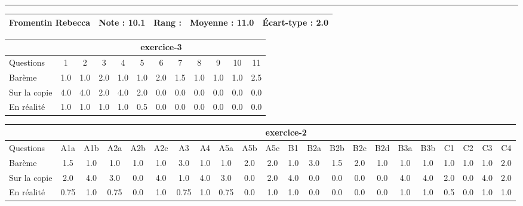 \documentclass[a4paper, landscape, 10pt]{article}
\begin{document}
  \vspace{0.3cm}
  \hrule
  \vspace{0.3cm}

  \begin{minipage}{\textwidth}
    { \bf
    \begin{tabular}{|c|*{4}{c|}}
    \hline
      Fromentin Rebecca & Note : 10.1 & Rang :  & Moyenne : 11.0 & \'Ecart-type : 2.0 \\
    \hline
    \end{tabular}
    }
    
      \begin{tabular}{|l|*{ 11 }{c|}}
        \hline
        & \multicolumn{ 11 }{c|}{ exercice-3 } \\
        \hline
        Questions & 1&2&3&4&5&6&7&8&9&10&11 \\
        \hline
        Barème & 1.0&1.0&2.0&1.0&1.0&2.0&1.5&1.0&1.0&1.0&2.5 \\
        \hline
        Sur la copie & 4.0&4.0&2.0&4.0&2.0&0.0&0.0&0.0&0.0&0.0&0.0 \\
        \hline
        En réalité & 1.0&1.0&1.0&1.0&0.5&0.0&0.0&0.0&0.0&0.0&0.0 \\
        \hline
      \end{tabular}
    
      \begin{tabular}{|l|*{ 21 }{c|}}
        \hline
        & \multicolumn{ 21 }{c|}{ exercice-2 } \\
        \hline
        Questions & A1a&A1b&A2a&A2b&A2c&A3&A4&A5a&A5b&A5c&B1&B2a&B2b&B2c&B2d&B3a&B3b&C1&C2&C3&C4 \\
        \hline
        Barème & 1.5&1.0&1.0&1.0&1.0&3.0&1.0&1.0&2.0&2.0&1.0&3.0&1.5&2.0&1.0&1.0&1.0&1.0&1.0&1.0&2.0 \\
        \hline
        Sur la copie & 2.0&4.0&3.0&0.0&4.0&1.0&4.0&3.0&0.0&2.0&4.0&0.0&0.0&0.0&0.0&4.0&4.0&2.0&0.0&4.0&2.0 \\
        \hline
        En réalité & 0.75&1.0&0.75&0.0&1.0&0.75&1.0&0.75&0.0&1.0&1.0&0.0&0.0&0.0&0.0&1.0&1.0&0.5&0.0&1.0&1.0 \\
        \hline
      \end{tabular}
    

\end{minipage}
\end{document}

